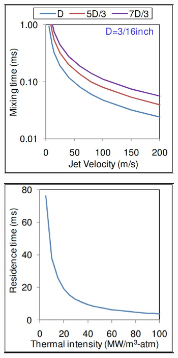 \begin{figure}[!ht]
    \begin{subfigure}[t]{0.3\textwidth}
        \centering        \includegraphics[width=0.97\textwidth]{Chapter3/Images/MixingTime.jpeg}
        \label{fig:mixingTime}
    \end{subfigure}
\hfill
    \begin{subfigure}[t]{0.3\textwidth}
        \centering
        \includegraphics[width=0.97\textwidth]{Chapter3/Images/residenceTimeVsIntensity.jpeg}

\end{subfigure}
\end{figure}
